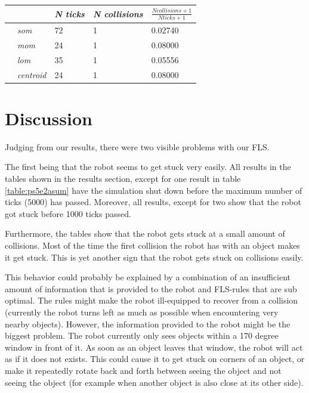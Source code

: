 \documentclass[conference]{IEEEtran}
\begin{document}
\begin{center}
\begin{tabular}{ | m{2.8em} | m{3em} | m{2.8em} | m{5em} | m{5.2em} | }
\hline
{} & \textit{N ticks} & \textit{N collisions} & $\frac{N collisions + 1}{N ticks + 1}$ \\
\hline
{} & \textit{som} & 72 & 1 & 0.02740 \\
 & \textit{mom} & 24 & 1 & 0.08000 \\
 & \textit{lom} & 35 & 1 & 0.05556 \\
 & \textit{centroid} & 24 & 1 & 0.08000 \\
\hline
\end{tabular}
\label{table:ps10e2asum}
\end{center}


\section{Discussion}
Judging from our results, there were two visible problems with our FLS.

The first being that the robot seems to get stuck very easily. All results in the tables shown in the results section, except for one result in table \ref{table:ps5e2asum} have the simulation shut down before the maximum number of ticks (5000) has passed. Moreover, all results, except for two show that the robot got stuck before 1000 ticks passed.

Furthermore, the tables show that the robot gets stuck at a small amount of collisions. Most of the time the first collision the robot has with an object makes it get stuck. This is yet another sign that the robot gets stuck on collisions easily.

This behavior could probably be explained by a combination of an insufficient amount of information that is provided to the robot and FLS-rules that are sub optimal. The rules might make the robot ill-equipped to recover from a collision (currently the robot turns left as much as possible when encountering very nearby objects). However, the information provided to the robot might be the biggest problem. The robot currently only sees objects within a 170 degree window in front of it. As soon as an object leaves that window, the robot will act as if it does not exists. This could cause it to get stuck on corners of an object, or make it repeatedly rotate back and forth between seeing the object and not seeing the object (for example when another object is also close at its other side).
\end{document}
